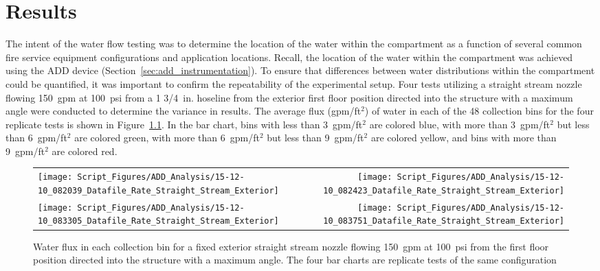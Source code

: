 \documentclass{book}
\begin{document}
\clearpage

\chapter{Results}

The intent of the water flow testing was to determine the location of the water within the compartment as a function of several common fire service equipment configurations and application locations. Recall, the location of the water within the compartment was achieved using the ADD device (Section~\ref{sec:add_instrumentation}). To ensure that differences between water distributions within the compartment could be quantified, it was important to confirm the repeatability of the experimental setup. Four tests utilizing a straight stream nozzle flowing 150~gpm at 100~psi from a 1 3/4~in. hoseline from the exterior first floor position directed into the structure with a maximum angle were conducted to determine the variance in results. The average flux (gpm/ft$^2$) of water in each of the 48 collection bins for the four replicate tests is shown in Figure~\ref{fig:Repeatability_Testing}. In the bar chart, bins with less than 3~gpm/ft$^2$ are colored blue, with more than 3~gpm/ft$^2$ but less than 6~gpm/ft$^2$ are colored green, with more than 6~gpm/ft$^2$ but less than 9~gpm/ft$^2$ are colored yellow, and bins with more than 9~gpm/ft$^2$ are colored red. 

\begin{figure}[ht]
\begin{tabular*}{\textwidth}{lr}
\texttt{[image: Script\_Figures/ADD\_Analysis/15-12-10\_082039\_Datafile\_Rate\_Straight\_Stream\_Exterior]} &
\texttt{[image: Script\_Figures/ADD\_Analysis/15-12-10\_082423\_Datafile\_Rate\_Straight\_Stream\_Exterior]} \\
\texttt{[image: Script\_Figures/ADD\_Analysis/15-12-10\_083305\_Datafile\_Rate\_Straight\_Stream\_Exterior]} &
\texttt{[image: Script\_Figures/ADD\_Analysis/15-12-10\_083751\_Datafile\_Rate\_Straight\_Stream\_Exterior]} \\
\end{tabular*}
\caption{Water flux in each collection bin for a fixed exterior straight stream nozzle flowing 150~gpm at 100~psi from the first floor position directed into the structure with a maximum angle. The four bar charts are replicate tests of the same configuration}
\label{fig:Repeatability_Testing}
\end{figure}
\end{document}
